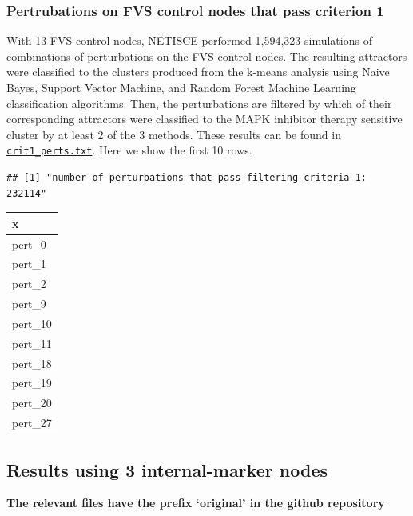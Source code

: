 \documentclass[
]{book}
\begin{document}
\hypertarget{section-id}{%
\subsubsection*{Pertrubations on FVS control nodes that pass criterion 1}\label{section-id}}

With 13 FVS control nodes, NETISCE performed 1,594,323 simulations of combinations of perturbations on the FVS control nodes. The resulting attractors were classified to the clusters produced from the k-means analysis using Naive Bayes, Support Vector Machine, and Random Forest Machine Learning classification algorithms. Then, the perturbations are filtered by which of their corresponding attractors were classified to the MAPK inhibitor therapy sensitive cluster by at least 2 of the 3 methods. These results can be found in \href{https://github.com/VeraLiconaResearchGroup/Netisce/blob/main/colorectal_cancer_validation/results/crit1perts.txt}{\texttt{crit1\_perts.txt}}. Here we show the first 10 rows.

\begin{verbatim}
## [1] "number of perturbations that pass filtering criteria 1: 232114"
\end{verbatim}

\begin{tabular}{l}
\hline
x\\
\hline
pert\_0\\
\hline
pert\_1\\
\hline
pert\_2\\
\hline
pert\_9\\
\hline
pert\_10\\
\hline
pert\_11\\
\hline
pert\_18\\
\hline
pert\_19\\
\hline
pert\_20\\
\hline
pert\_27\\
\hline
\end{tabular}

\hypertarget{results-using-3-internal-marker-nodes}{%
\subsection{Results using 3 internal-marker nodes}\label{results-using-3-internal-marker-nodes}}

\textbf{The relevant files have the prefix `original' in the github repository}
\end{document}
